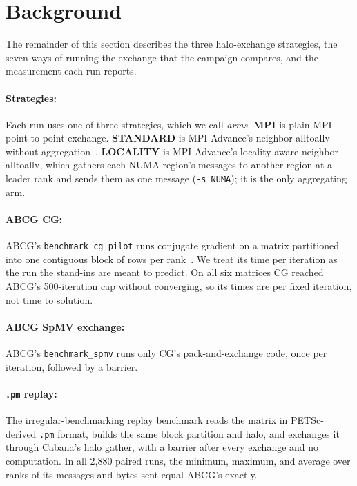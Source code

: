\documentclass[11pt]{article}
\newcommand{\pmrep}{\texttt{.pm} replay}
\begin{document}
\section{Background}
\label{sec:background}

The remainder of this section describes the three halo-exchange strategies, the seven ways
of running the exchange that the campaign compares, and the measurement each run reports.

\paragraph{Strategies:} Each run uses one of three strategies, which we call \emph{arms}.
\textbf{MPI} is plain MPI point-to-point exchange. \textbf{STANDARD} is MPI Advance's
neighbor alltoallv without aggregation~\cite{mpiadvance2023}. \textbf{LOCALITY} is MPI
Advance's locality-aware neighbor alltoallv, which gathers each NUMA region's messages to
another region at a leader rank and sends them as one message (\texttt{-s NUMA}); it is
the only aggregating arm.

\paragraph{ABCG CG:} ABCG's \texttt{benchmark\_cg\_pilot} runs conjugate gradient on a
matrix partitioned into one contiguous block of rows per rank~\cite{abcg}. We treat its time
per iteration as the run the stand-ins are meant to predict. On all six matrices CG
reached ABCG's 500-iteration cap without converging, so its times are per fixed iteration,
not time to solution.

\paragraph{ABCG SpMV exchange:} ABCG's \texttt{benchmark\_spmv} runs only CG's
pack-and-exchange code, once per iteration, followed by a barrier.

\paragraph{\pmrep:} The irregular-benchmarking replay benchmark reads the matrix in
PETSc-derived \texttt{.pm} format, builds the same block partition and halo, and exchanges
it through Cabana's halo gather, with a barrier after every exchange and no computation. In
all 2,880 paired runs, the minimum, maximum, and average over ranks of its messages and
bytes sent equal ABCG's exactly.
\end{document}
